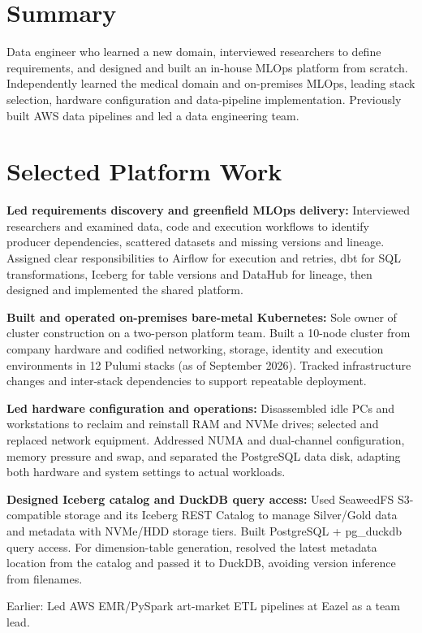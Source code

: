 \section{Summary}
\begin{itemize}[leftmargin=0.15in, label={}]
\small{\item{Data engineer who learned a new domain, interviewed researchers to define requirements, and designed and built an in-house MLOps platform from scratch. Independently learned the medical domain and on-premises MLOps, leading stack selection, hardware configuration and data-pipeline implementation. Previously built AWS data pipelines and led a data engineering team.}}
\end{itemize}
\section{Selected Platform Work}
\begin{itemize}[leftmargin=0.15in, label={}]
\small{
\item{\textbf{Led requirements discovery and greenfield MLOps delivery:} Interviewed researchers and examined data, code and execution workflows to identify producer dependencies, scattered datasets and missing versions and lineage. Assigned clear responsibilities to Airflow for execution and retries, dbt for SQL transformations, Iceberg for table versions and DataHub for lineage, then designed and implemented the shared platform.}
\item{\textbf{Built and operated on-premises bare-metal Kubernetes:} Sole owner of cluster construction on a two-person platform team. Built a 10-node cluster from company hardware and codified networking, storage, identity and execution environments in 12 Pulumi stacks (as of September 2026). Tracked infrastructure changes and inter-stack dependencies to support repeatable deployment.}
\item{\textbf{Led hardware configuration and operations:} Disassembled idle PCs and workstations to reclaim and reinstall RAM and NVMe drives; selected and replaced network equipment. Addressed NUMA and dual-channel configuration, memory pressure and swap, and separated the PostgreSQL data disk, adapting both hardware and system settings to actual workloads.}
\item{\textbf{Designed Iceberg catalog and DuckDB query access:} Used SeaweedFS S3-compatible storage and its Iceberg REST Catalog to manage Silver/Gold data and metadata with NVMe/HDD storage tiers. Built PostgreSQL + pg\_duckdb query access. For dimension-table generation, resolved the latest metadata location from the catalog and passed it to DuckDB, avoiding version inference from filenames.}
\item{Earlier: Led AWS EMR/PySpark art-market ETL pipelines at Eazel as a team lead.}
}
\end{itemize}
